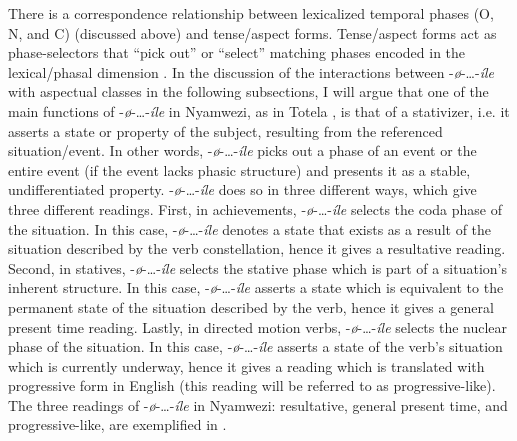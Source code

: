 \documentclass[output=paper,newtxmath,modfonts,nonflat,draftmode]{langsci/langscibook}
\begin{document}
There is a correspondence relationship between lexicalized temporal phases (O, N, and C) (discussed above) and tense/aspect forms. Tense/aspect forms act as phase-selectors that “pick out” or “select” matching phases encoded in the lexical/phasal dimension \citep[223]{Sasse2002}. In the discussion of the interactions between -\textit{ø}-…-\textit{íle} with aspectual classes in the following subsections, I will argue that one of the main functions of -\textit{ø}-…-\textit{íle} in Nyamwezi, as in Totela \citep{Crane2013}, is that of a stativizer, i.e. it asserts a state or property of the subject, resulting from the referenced situation/event. In other words, -\textit{ø}-…-\textit{íle} picks out a phase of an event or the entire event (if the event lacks phasic structure) and presents it as a stable, undifferentiated property. -\textit{ø}-…-\textit{íle} does so in three different ways, which give three different readings. First, in achievements, -\textit{ø}-…-\textit{íle} selects the coda phase of the situation. In this case, -\textit{ø}-…-\textit{íle} denotes a state that exists as a result of the situation described by the verb constellation, hence it gives a resultative reading. Second, in statives, -\textit{ø}-…-\textit{íle} selects the stative phase which is part of a situation’s inherent structure. In this case, -\textit{ø}-…-\textit{íle} asserts a state which is equivalent to the permanent state of the situation described by the verb, hence it gives a general present time reading. Lastly, in directed motion verbs, -\textit{ø}-…-\textit{íle} selects the nuclear phase of the situation. In this case, -\textit{ø}-…-\textit{íle} asserts a state of the verb’s situation which is currently underway, hence it gives a reading which is translated with progressive form in English (this reading will be referred to as progressive-like). The three readings of -\textit{ø}-…-\textit{íle} in Nyamwezi: resultative, general present time, and progressive-like, are exemplified in . 
\end{document}
